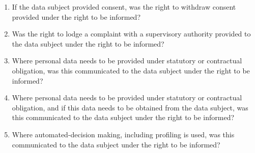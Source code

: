 \begin{enumerate}[label={\textit{CMQ.\theenumi}},resume]
    \item If the data subject provided consent, was the right to withdraw consent provided under the right to be informed?
    \item Was the right to lodge a complaint with a supervisory authority provided to the data subject under the right to be informed?
    \item Where personal data needs to be provided under statutory or contractual obligation, was this communicated to the data subject under the right to be informed?
    \item Where personal data needs to be provided under statutory or contractual obligation, and if this data needs to be obtained from the data subject, was this communicated to the data subject under the right to be informed?
    \item Where automated-decision making, including profiling is used, was this communicated to the data subject under the right to be informed?
\end{enumerate}

